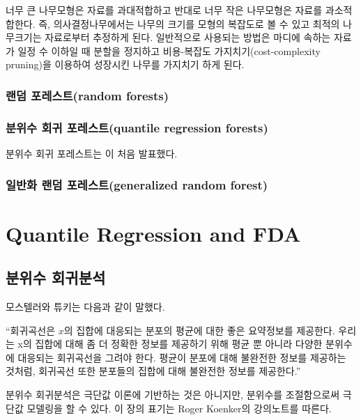 \documentclass[b5paper,]{scrbook}
\theoremstyle{plain}
\theoremstyle{definition}
\numberwithin{equation}{section}
\begin{document}
너무 큰 나무모형은 자료를 과대적합하고 반대로 너무 작은 나무모형은 자료를 과소적합한다. 즉, 의사결정나무에서는 나무의 크기를 모형의 복잡도로 볼 수 있고 최적의 나무크기는 자료로부터 추정하게 된다. 일반적으로 사용되는 방법은 마디에 속하는 자료가 일정 수 이하일 때 분할을 정지하고 비용-복잡도 가지치기(cost-complexity pruning)을 이용하여 성장시킨 나무를 가지치기 하게 된다.

\hypertarget{-random-forests}{%
\section{랜덤 포레스트(random forests)}\label{-random-forests}}

\hypertarget{--quantile-regression-forests}{%
\section{분위수 회귀 포레스트(quantile regression forests)}\label{--quantile-regression-forests}}

분위수 회귀 포레스트는 \citep{Meinshausen2006}이 처음 발표했다.

\hypertarget{--generalized-random-forest}{%
\section{일반화 랜덤 포레스트(generalized random forest)}\label{--generalized-random-forest}}

\hypertarget{part-quantile-regression-and-fda}{%
\part{Quantile Regression and FDA}\label{part-quantile-regression-and-fda}}

\hypertarget{qr}{%
\chapter{분위수 회귀분석}\label{qr}}

모스텔러와 튜키는 다음과 같이 말했다.

``회귀곡선은 \(x\)의 집합에 대응되는 분포의 평균에 대한 좋은 요약정보를 제공한다. 우리는 x의 집합에 대해 좀 더 정확한 정보를 제공하기 위해 평균 뿐 아니라 다양한 분위수에 대응되는 회귀곡선을 그려야 한다. 평균이 분포에 대해 불완전한 정보를 제공하는 것처럼, 회귀곡선 또한 분포들의 집합에 대해 불완전한 정보를 제공한다.''

분위수 회귀분석은 극단값 이론에 기반하는 것은 아니지만, 분위수를 조절함으로써 극단값 모델링을 할 수 있다. 이 장의 표기는 Roger Koenker의 강의노트를 따른다.
\end{document}

